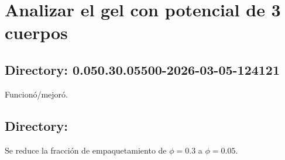 \documentclass[../main.tex]{subfiles}
\begin{document}
\justifying

\section{Analizar el gel con potencial de 3 cuerpos}

\subsection{Directory: 0.050.30.05500-2026-03-05-124121}

Funcionó/mejoró.

\newpage

\subsection{Directory: }

Se reduce la fracción de empaquetamiento de \(\phi=0.3\) a \(\phi=0.05\).
\end{document}
